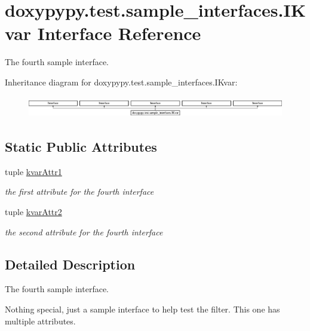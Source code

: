 \hypertarget{classdoxypypy_1_1test_1_1sample__interfaces_1_1_i_kvar}{\section{doxypypy.\-test.\-sample\-\_\-interfaces.\-I\-Kvar Interface Reference}
\label{classdoxypypy_1_1test_1_1sample__interfaces_1_1_i_kvar}
}


The fourth sample interface.  


Inheritance diagram for doxypypy.\-test.\-sample\-\_\-interfaces.\-I\-Kvar\-:\begin{figure}[H]
\begin{center}
\leavevmode
\includegraphics[height=0.941176cm]{classdoxypypy_1_1test_1_1sample__interfaces_1_1_i_kvar}
\end{center}
\end{figure}
\subsection*{Static Public Attributes}
\begin{DoxyCompactItemize}
\item 
tuple \hyperlink{classdoxypypy_1_1test_1_1sample__interfaces_1_1_i_kvar_aa15c60da40816aa3d268c4b13c21ee17}{kvar\-Attr1}
\begin{DoxyCompactList}\small\item\em the first attribute for the fourth interface \end{DoxyCompactList}\item 
tuple \hyperlink{classdoxypypy_1_1test_1_1sample__interfaces_1_1_i_kvar_a2fac6d5b7b1c1e792febd39470470bc0}{kvar\-Attr2}
\begin{DoxyCompactList}\small\item\em the second attribute for the fourth interface \end{DoxyCompactList}\end{DoxyCompactItemize}


\subsection{Detailed Description}
The fourth sample interface. 

Nothing special, just a sample interface to help test the filter. This one has multiple attributes. 

